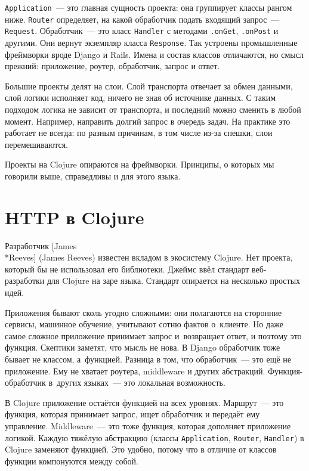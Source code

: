 \verb|Application|~--- это главная сущность проекта: она группирует классы рангом
ниже. \verb|Router| определяет, на какой обработчик подать входящий запрос~---
\verb|Request|. Обработчик~--- это класс \verb|Handler| с методами
\verb|.onGet|, \verb|.onPost| и другими. Они вернут экземпляр класса
\verb|Response|. Так устроены промышленные фреймворки вроде Django и
Rails. Имена и состав классов отличаются, но смысл прежний: приложение, роутер,
обработчик, запрос и ответ.


Большие проекты делят на слои. Слой транспорта отвечает за обмен данными, слой
логики исполняет код, ничего не зная об источнике данных. С таким подходом
логика не зависит от транспорта, и последний можно сменить в любой
момент. Например, направить долгий запрос в очередь задач. На практике это
работает не всегда: по разным причинам, в том числе из-за спешки, слои
перемешиваются.

Проекты на Clojure опираются на фреймворки. Принципы, о которых мы говорили
выше, справедливы и для этого языка.

\section{HTTP в Clojure}


Разработчик [James\\*Reeves] (James Reeves)
известен вкладом в экосистему Clojure. Нет проекта, который бы не использовал
его библиотеки. Джеймс ввёл стандарт веб-разработки для Clojure на заре
языка. Стандарт опирается на несколько простых идей.

Приложения бывают сколь угодно сложными: они полагаются на сторонние сервисы,
машинное обучение, учитывают сотню фактов о~клиенте. Но даже самое сложное
приложение принимает запрос и~возвращает ответ, и поэтому это функция. Скептики
заметят, что мысль не нова. В Django обработчик тоже бывает не классом,
а~функцией. Разница в том, что обработчик~--- это ещё не приложение. Ему не хватает
роутера, middleware и других абстракций. Функция-обработчик в~других языках~--- это
локальная возможность.

\label{http-all-function}

В Clojure приложение остаётся функцией на всех уровнях. Маршрут~--- это функция,
которая принимает запрос, ищет обработчик и передаёт ему управление. Middleware~---
это тоже функция, которая дополняет приложение логикой. Каждую тяжёлую
абстракцию (классы \verb|Application|, \verb|Router|, \verb|Handler|) в
Clojure заменяют функцией. Это удобно, потому что в отличие от классов функции
компонуются между собой.

